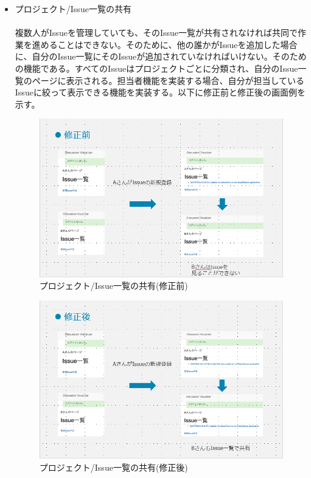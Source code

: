 \documentclass[12pt, oneside]{jreport}
\begin{document}
\begin{itemize}
			\item プロジェクト/Issue一覧の共有
			\\ \\
			複数人がIssueを管理していても、そのIssue一覧が共有されなければ共同で作業を進めることはできない。そのために、他の誰かがIssueを追加した場合に、自分のIssue一覧にそのIssueが追加されていなければいけない。そのための機能である。すべてのIssueはプロジェクトごとに分類され、自分のIssue一覧のページに表示される。担当者機能を実装する場合、自分が担当しているIssueに絞って表示できる機能を実装する。以下に修正前と修正後の画面例を示す。
			\begin{figure}[H]
			\centering
			\includegraphics[width=17cm,bb=200 300 -200 27]{IssShare_before.PNG}
			\caption{プロジェクト/Issue一覧の共有(修正前)}
			\end{figure}
			\begin{figure}[H]
			\centering
			\includegraphics[width=17cm,bb=200 300 -200 27]{IssShare_after.PNG}
			\caption{プロジェクト/Issue一覧の共有(修正後)}
			\end{figure}


\end{itemize}
\end{document}
